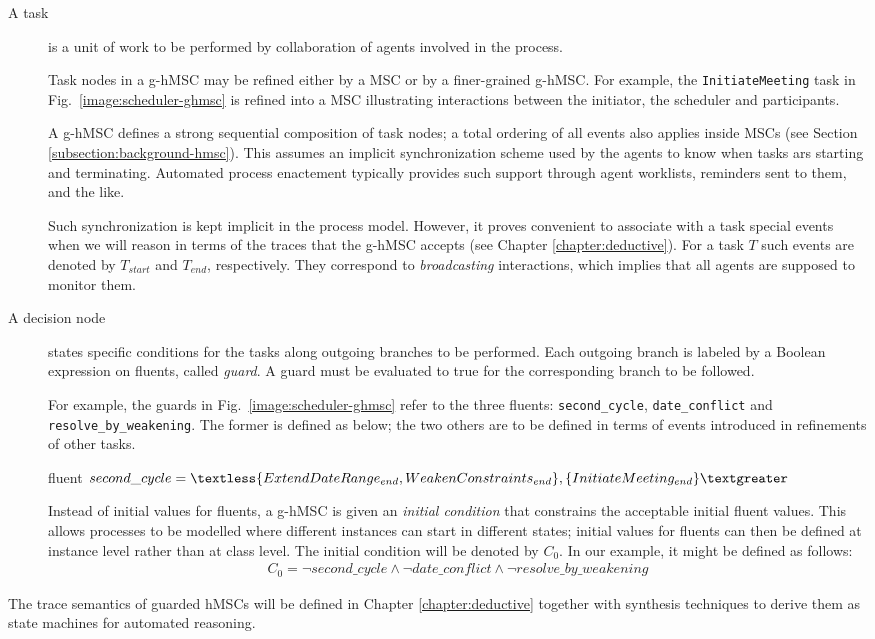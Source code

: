 \begin{description}
\item[A task] is a unit of work to be performed by collaboration of agents involved in the process. 

Task nodes in a g-hMSC may be refined either by a MSC or by a finer-grained g-hMSC. For example, the \texttt{InitiateMeeting} task in Fig.~\ref{image:scheduler-ghmsc} is refined into a MSC illustrating interactions between the initiator, the scheduler and participants. 

A g-hMSC defines a strong sequential composition of task nodes; a total ordering of all events also applies inside MSCs (see Section \ref{subsection:background-hmsc}). This assumes an implicit synchronization scheme used by the agents to know when tasks ars starting and terminating. Automated process enactement typically provides such support through agent worklists, reminders sent to them, and the like. 

Such synchronization is kept implicit in the process model. However, it proves convenient to associate with a task special events when we will reason in terms of the traces that the g-hMSC accepts (see Chapter \ref{chapter:deductive}). For a task $T$ such events are denoted by $T_{start}$ and $T_{end}$, respectively. They correspond to \emph{broadcasting} interactions, which implies that all agents are supposed to monitor them. 

\item[A decision node] states specific conditions for the tasks along outgoing branches to be performed. Each outgoing branch is labeled by a Boolean expression on fluents, called \emph{guard}. A guard must be evaluated to true for the corresponding branch to be followed.

For example, the guards in Fig.~\ref{image:scheduler-ghmsc} refer to the three fluents: \texttt{second\_cycle}, \texttt{date\_conflict} and \texttt{resolve\_by\_weakening}. The former is defined as below; the two others are to be defined in terms of events introduced in refinements of other tasks.
\begin{center}
fluent $second\_cycle = \textless \{ ExtendDateRange_{end}, \newline WeakenConstraints_{end} \},
 \{ InitiateMeeting_{end} \} \textgreater $\\
\end{center}

Instead of initial values for fluents, a g-hMSC is given an \emph{initial condition} that constrains the acceptable initial fluent values. This allows processes to be modelled where different instances can start in different states; initial values for fluents can then be defined at instance level rather than at class level. The initial condition will be denoted by $C_0$. In our example, it might be defined as follows:
\begin{align*}
C_0 = \neg second\_cycle \wedge \neg date\_conflict \wedge \neg resolve\_by\_weakening
\end{align*}

\end{description} 

The trace semantics of guarded hMSCs will be defined in Chapter \ref{chapter:deductive} together with synthesis techniques to derive them as state machines for automated reasoning.
